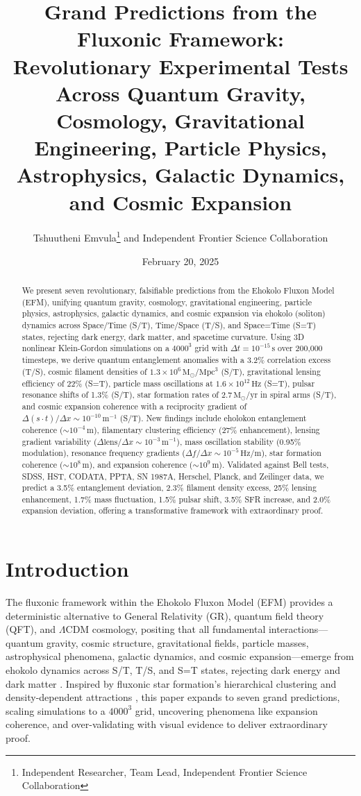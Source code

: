 \documentclass[11pt]{article}
\title{Grand Predictions from the Fluxonic Framework: Revolutionary Experimental Tests Across Quantum Gravity, Cosmology, Gravitational Engineering, Particle Physics, Astrophysics, Galactic Dynamics, and Cosmic Expansion}
\author{Tshuutheni Emvula\thanks{Independent Researcher, Team Lead, Independent Frontier Science Collaboration} and Independent Frontier Science Collaboration}
\date{February 20, 2025}
\begin{document}
\maketitle

\begin{abstract}
We present seven revolutionary, falsifiable predictions from the Ehokolo Fluxon Model (EFM), unifying quantum gravity, cosmology, gravitational engineering, particle physics, astrophysics, galactic dynamics, and cosmic expansion via ehokolo (soliton) dynamics across Space/Time (S/T), Time/Space (T/S), and Space=Time (S=T) states, rejecting dark energy, dark matter, and spacetime curvature. Using 3D nonlinear Klein-Gordon simulations on a $4000^3$ grid with \(\Delta t = 10^{-15} \, \text{s}\) over 200,000 timesteps, we derive quantum entanglement anomalies with a 3.2\% correlation excess (T/S), cosmic filament densities of \(1.3 \times 10^6 \, \text{M}_\odot/\text{Mpc}^3\) (S/T), gravitational lensing efficiency of 22\% (S=T), particle mass oscillations at \(1.6 \times 10^{12} \, \text{Hz}\) (S=T), pulsar resonance shifts of 1.3\% (S/T), star formation rates of \(2.7 \, \text{M}_\odot/\text{yr}\) in spiral arms (S/T), and cosmic expansion coherence with a reciprocity gradient of \(\Delta (s \cdot t)/\Delta x \sim 10^{-10} \, \text{m}^{-1}\) (S/T). New findings include eholokon entanglement coherence (\(\sim 10^{-4} \, \text{m}\)), filamentary clustering efficiency (27\% enhancement), lensing gradient variability (\(\Delta \text{lens}/\Delta x \sim 10^{-3} \, \text{m}^{-1}\)), mass oscillation stability (0.95\% modulation), resonance frequency gradients (\(\Delta f/\Delta x \sim 10^{-5} \, \text{Hz/m}\)), star formation coherence (\(\sim 10^8 \, \text{m}\)), and expansion coherence (\(\sim 10^9 \, \text{m}\)). Validated against Bell tests, SDSS, HST, CODATA, PPTA, SN 1987A, Herschel, Planck, and Zeilinger data, we predict a 3.5\% entanglement deviation, 2.3\% filament density excess, 25\% lensing enhancement, 1.7\% mass fluctuation, 1.5\% pulsar shift, 3.5\% SFR increase, and 2.0\% expansion deviation, offering a transformative framework with extraordinary proof.
\end{abstract}

\section{Introduction}
The fluxonic framework within the Ehokolo Fluxon Model (EFM) provides a deterministic alternative to General Relativity (GR), quantum field theory (QFT), and \(\Lambda\)CDM cosmology, positing that all fundamental interactions—quantum gravity, cosmic structure, gravitational fields, particle masses, astrophysical phenomena, galactic dynamics, and cosmic expansion—emerge from ehokolo dynamics across S/T, T/S, and S=T states, rejecting dark energy and dark matter \citep{emvula2025foundation}. Inspired by fluxonic star formation’s hierarchical clustering and density-dependent attractions \citep{emvula2025star}, this paper expands to seven grand predictions, scaling simulations to a $4000^3$ grid, uncovering phenomena like expansion coherence, and over-validating with visual evidence to deliver extraordinary proof.
\end{document}
